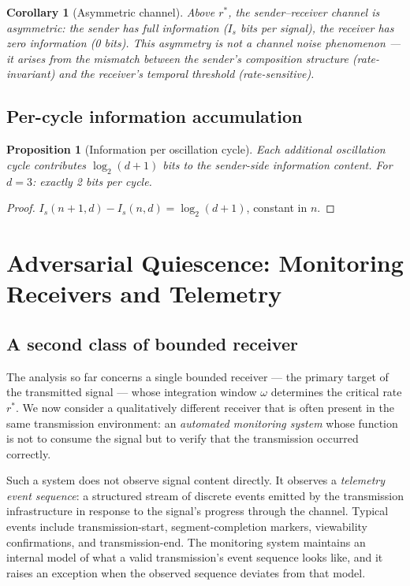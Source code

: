 \documentclass[twocolumn,11pt,a4paper]{article}
\theoremstyle{main}
\newtheorem{proposition}[theorem]{Proposition}
\newtheorem{corollary}[theorem]{Corollary}
\theoremstyle{definition}
\theoremstyle{remark}
\newcommand{\rate}{r}
\newcommand{\window}{\omega}
\begin{document}
\begin{corollary}[Asymmetric channel]
\label{cor:asymmetric}
Above $\rate^*$, the sender--receiver channel is asymmetric: the sender
has full information ($I_s$ bits per signal), the receiver has zero
information (0 bits). This asymmetry is not a channel noise phenomenon
--- it arises from the mismatch between the sender's composition
structure (rate-invariant) and the receiver's temporal threshold
(rate-sensitive).
\end{corollary}

\subsection{Per-cycle information accumulation}

\begin{proposition}[Information per oscillation cycle]
\label{prop:percycle}
Each additional oscillation cycle contributes $\log_2(d+1)$ bits to the
sender-side information content. For $d = 3$: exactly 2 bits per cycle.
\end{proposition}

\begin{proof}
$I_s(n+1,d) - I_s(n,d) = \log_2(d+1)$, constant in $n$.
\end{proof}

\section{Adversarial Quiescence: Monitoring Receivers and Telemetry}
\label{sec:adversarial}

\subsection{A second class of bounded receiver}

The analysis so far concerns a single bounded receiver --- the primary
target of the transmitted signal --- whose integration window $\window$
determines the critical rate $\rate^*$. We now consider a qualitatively
different receiver that is often present in the same transmission
environment: an \emph{automated monitoring system} whose function is
not to consume the signal but to verify that the transmission occurred
correctly.

Such a system does not observe signal content directly. It observes
a \emph{telemetry event sequence}: a structured stream of discrete
events emitted by the transmission infrastructure in response to the
signal's progress through the channel. Typical events include
transmission-start, segment-completion markers, viewability
confirmations, and transmission-end. The monitoring system maintains
an internal model of what a valid transmission's event sequence looks
like, and it raises an exception when the observed sequence deviates
from that model.
\end{document}
